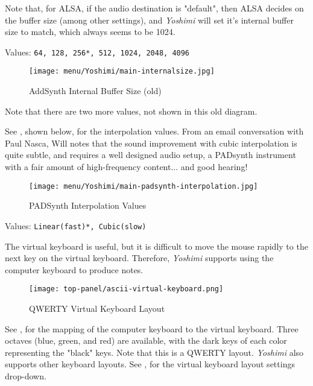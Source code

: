    Note that, for ALSA, if the audio destination is "default",
   then ALSA decides on the buffer size (among other settings), and
   \textsl{Yoshimi} will set it's internal buffer size to match,
   which always seems to be 1024.

   Values: \texttt{64, 128, 256*, 512, 1024, 2048, 4096}

\begin{figure}[H]
   \centering 
   \texttt{[image: menu/Yoshimi/main-internalsize.jpg]}
   \caption[Internal Size Values]{AddSynth Internal Buffer Size (old)}
   \label{fig:yoshimi_internalsize_values}
\end{figure}

   Note that there are two more values, not shown in this old diagram.

   See , shown below,
   for the interpolation values.
   From an email conversation with Paul Nasca, Will notes that
   the sound improvement with cubic interpolation is quite subtle, and requires
   a well designed audio setup, a PADsynth instrument with a fair amount of
   high-frequency content... and good hearing!

\begin{figure}[H]
   \centering 
   \texttt{[image: menu/Yoshimi/main-padsynth-interpolation.jpg]}
   \caption[PADSynth Interpolation]{PADSynth Interpolation Values}
   \label{fig:padsynth_interpolation}
\end{figure}

   Values: \texttt{Linear(fast)*, Cubic(slow)}

   The virtual keyboard is useful, but it is difficult to move the mouse
   rapidly to the next key on the virtual keyboard.
   Therefore, \textsl{Yoshimi} supports using the computer keyboard
   to produce notes.

\begin{figure}[H]
   \centering 
   \texttt{[image: top-panel/ascii-virtual-keyboard.png]}
   \caption{QWERTY Virtual Keyboard Layout}
   \label{fig:qwerty_virtual_keyboard}
\end{figure}

   See ,
   for the mapping of the computer keyboard to the
   virtual keyboard.
   Three octaves (blue, green, and red) are available, with the dark keys of
   each color representing the "black" keys.
   Note that this is a QWERTY layout.  
   \textsl{Yoshimi} also supports other keyboard layouts.
   See ,
   for the virtual keyboard layout settings drop-down.

